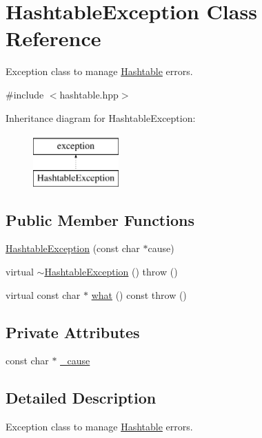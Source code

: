 \hypertarget{class_hashtable_exception}{\section{Hashtable\-Exception Class Reference}
\label{class_hashtable_exception}
}


Exception class to manage \hyperlink{class_hashtable}{Hashtable} errors.  




{\ttfamily \#include $<$hashtable.\-hpp$>$}

Inheritance diagram for Hashtable\-Exception\-:\begin{figure}[H]
\begin{center}
\leavevmode
\includegraphics[height=2.000000cm]{class_hashtable_exception}
\end{center}
\end{figure}
\subsection*{Public Member Functions}
\begin{DoxyCompactItemize}
\item 
\hyperlink{class_hashtable_exception_a1a3ae95bd655064144b485f0938fddca}{Hashtable\-Exception} (const char $\ast$cause)
\item 
virtual \hyperlink{class_hashtable_exception_a9668a272e0470e9d4a16f0f5307e6153}{$\sim$\-Hashtable\-Exception} ()  throw ()
\item 
virtual const char $\ast$ \hyperlink{class_hashtable_exception_a980d0861fe744622043fcdd654ea5e07}{what} () const   throw ()
\end{DoxyCompactItemize}
\subsection*{Private Attributes}
\begin{DoxyCompactItemize}
\item 
const char $\ast$ \hyperlink{class_hashtable_exception_a242dcd5048ce89c2aadd0ca97f5c6d9a}{\-\_\-cause}
\end{DoxyCompactItemize}


\subsection{Detailed Description}
Exception class to manage \hyperlink{class_hashtable}{Hashtable} errors. 

